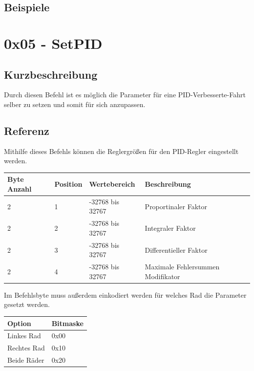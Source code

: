 \documentclass[a4paper]{article}
\begin{document}
	\subsection{Beispiele}
	\pagebreak


	\section{0x05 - SetPID}

	\subsection{Kurzbeschreibung}

	Durch diesen Befehl ist es möglich die Parameter für eine PID-Verbesserte-Fahrt selber zu setzen und somit für sich
	anzupassen.

	\subsection{Referenz}

	Mithilfe dieses Befehls können die Reglergrößen für den PID-Regler eingestellt werden.

	\begin{tabularx}{\linewidth}{|l|l|l|X|}
		\hline
		\textbf{Byte Anzahl} & \textbf{Position} & \textbf{Wertebereich} & \textbf{Beschreibung} \\
		\hline
		\hline
		2					 & 1 & -32768 bis 32767 & Proportinaler Faktor\\
		\hline
		2					 & 2 & -32768 bis 32767 & Integraler Faktor\\
		\hline
		2					 & 3 & -32768 bis 32767 & Differentieller Faktor\\
		\hline
		2					 & 4 & -32768 bis 32767 & Maximale Fehlersummen Modifikator\\
		\hline
	\end{tabularx}

	Im Befehlsbyte muss außerdem einkodiert werden für welches Rad die Parameter gesetzt werden.

	\begin{tabularx}{\linewidth}{|l|X|}
		\hline
		\textbf{Option} & \textbf{Bitmaske} \\
		\hline
		\hline
		Linkes Rad	& 0x00 \\
		\hline
		Rechtes Rad	& 0x10 \\
		\hline
		Beide Räder & 0x20 \\
		\hline
	\end{tabularx}
\end{document}

